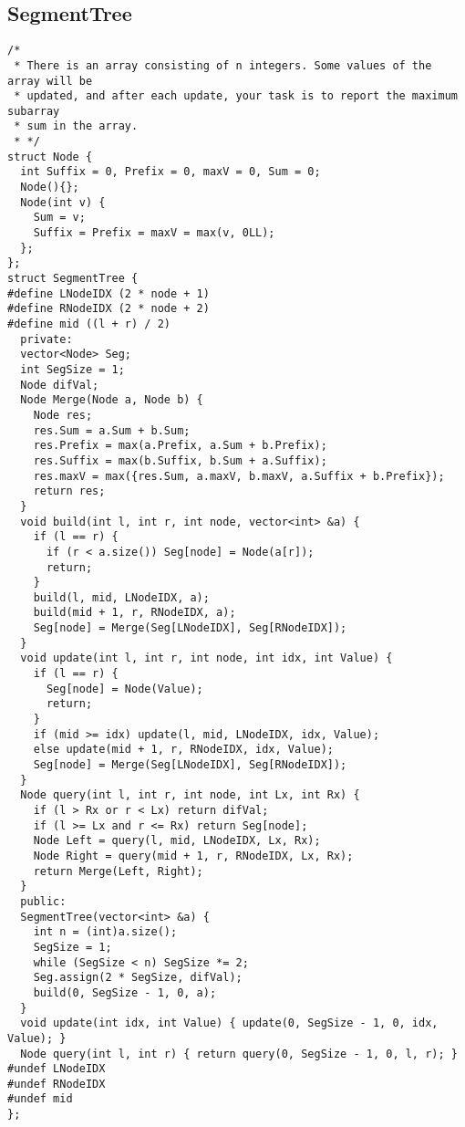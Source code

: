 \documentclass[twoside]{article}
\begin{document}
\begin{multicols*}{2}
{\subsection*{SegmentTree}
}
\begin{verbatim}
/*
 * There is an array consisting of n integers. Some values of the array will be
 * updated, and after each update, your task is to report the maximum subarray
 * sum in the array.
 * */
struct Node {
  int Suffix = 0, Prefix = 0, maxV = 0, Sum = 0;
  Node(){};
  Node(int v) {
    Sum = v;
    Suffix = Prefix = maxV = max(v, 0LL);
  };
};
struct SegmentTree {
#define LNodeIDX (2 * node + 1)
#define RNodeIDX (2 * node + 2)
#define mid ((l + r) / 2)
  private:
  vector<Node> Seg;
  int SegSize = 1;
  Node difVal;
  Node Merge(Node a, Node b) {
    Node res;
    res.Sum = a.Sum + b.Sum;
    res.Prefix = max(a.Prefix, a.Sum + b.Prefix);
    res.Suffix = max(b.Suffix, b.Sum + a.Suffix);
    res.maxV = max({res.Sum, a.maxV, b.maxV, a.Suffix + b.Prefix});
    return res;
  }
  void build(int l, int r, int node, vector<int> &a) {
    if (l == r) {
      if (r < a.size()) Seg[node] = Node(a[r]);
      return;
    }
    build(l, mid, LNodeIDX, a);
    build(mid + 1, r, RNodeIDX, a);
    Seg[node] = Merge(Seg[LNodeIDX], Seg[RNodeIDX]);
  }
  void update(int l, int r, int node, int idx, int Value) {
    if (l == r) {
      Seg[node] = Node(Value);
      return;
    }
    if (mid >= idx) update(l, mid, LNodeIDX, idx, Value);
    else update(mid + 1, r, RNodeIDX, idx, Value);
    Seg[node] = Merge(Seg[LNodeIDX], Seg[RNodeIDX]);
  }
  Node query(int l, int r, int node, int Lx, int Rx) {
    if (l > Rx or r < Lx) return difVal;
    if (l >= Lx and r <= Rx) return Seg[node];
    Node Left = query(l, mid, LNodeIDX, Lx, Rx);
    Node Right = query(mid + 1, r, RNodeIDX, Lx, Rx);
    return Merge(Left, Right);
  }
  public:
  SegmentTree(vector<int> &a) {
    int n = (int)a.size();
    SegSize = 1;
    while (SegSize < n) SegSize *= 2;
    Seg.assign(2 * SegSize, difVal);
    build(0, SegSize - 1, 0, a);
  }
  void update(int idx, int Value) { update(0, SegSize - 1, 0, idx, Value); }
  Node query(int l, int r) { return query(0, SegSize - 1, 0, l, r); }
#undef LNodeIDX
#undef RNodeIDX
#undef mid
};

\end{verbatim}

{
}
\end{multicols*}
\end{document}
